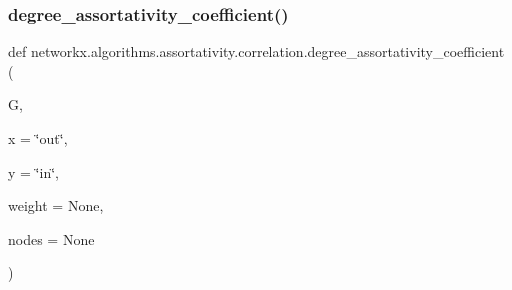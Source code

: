 \subsubsection{\texorpdfstring{degree\+\_\+assortativity\+\_\+coefficient()}{degree\_assortativity\_coefficient()}}
{\footnotesize\ttfamily def networkx.\+algorithms.\+assortativity.\+correlation.\+degree\+\_\+assortativity\+\_\+coefficient (\begin{DoxyParamCaption}\item[{}]{G,  }\item[{}]{x = {\ttfamily \char`\"{}out\char`\"{}},  }\item[{}]{y = {\ttfamily \char`\"{}in\char`\"{}},  }\item[{}]{weight = {\ttfamily None},  }\item[{}]{nodes = {\ttfamily None} }\end{DoxyParamCaption})}

